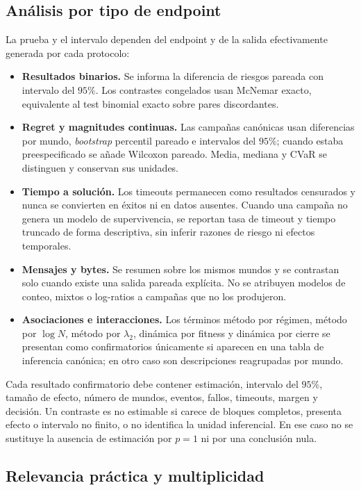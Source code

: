 \subsection{Análisis por tipo de endpoint}

La prueba y el intervalo dependen del endpoint y de la salida efectivamente generada por cada protocolo:
\begin{itemize}[leftmargin=2em]
  \item \textbf{Resultados binarios.} Se informa la diferencia de riesgos pareada con intervalo del $95\%$. Los contrastes congelados usan McNemar exacto, equivalente al test binomial exacto sobre pares discordantes.
  \item \textbf{Regret y magnitudes continuas.} Las campa\~nas can\'onicas usan diferencias por mundo, \emph{bootstrap} percentil pareado e intervalos del $95\%$; cuando estaba preespecificado se a\~nade Wilcoxon pareado. Media, mediana y CVaR se distinguen y conservan sus unidades.
  \item \textbf{Tiempo a soluci\'on.} Los timeouts permanecen como resultados censurados y nunca se convierten en \'exitos ni en datos ausentes. Cuando una campa\~na no genera un modelo de supervivencia, se reportan tasa de timeout y tiempo truncado de forma descriptiva, sin inferir razones de riesgo ni efectos temporales.
  \item \textbf{Mensajes y bytes.} Se resumen sobre los mismos mundos y se contrastan solo cuando existe una salida pareada expl\'icita. No se atribuyen modelos de conteo, mixtos o log-ratios a campa\~nas que no los produjeron.
  \item \textbf{Asociaciones e interacciones.} Los t\'erminos m\'etodo por r\'egimen, m\'etodo por $\log N$, m\'etodo por $\lambda_2$, din\'amica por fitness y din\'amica por cierre se presentan como confirmatorios \'unicamente si aparecen en una tabla de inferencia can\'onica; en otro caso son descripciones reagrupadas por mundo.
\end{itemize}

Cada resultado confirmatorio debe contener estimación, intervalo del $95\%$, tamaño de efecto, número de mundos, eventos, fallos, timeouts, margen y decisión. Un contraste es no estimable si carece de bloques completos, presenta efecto o intervalo no finito, o no identifica la unidad inferencial. En ese caso no se sustituye la ausencia de estimación por $p=1$ ni por una conclusión nula.

\subsection{Relevancia práctica y multiplicidad}

